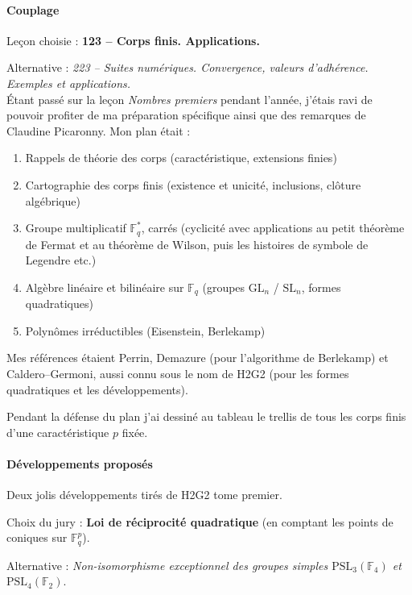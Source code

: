 \documentclass[a4paper, 11pt]{article}
\begin{document}
\def\F{\mathbb{F}}
\def\Z{\mathbb{Z}}
\def\GL{\mathrm{GL}}
\def\SL{\mathrm{SL}}
\def\PSL{\mathrm{PSL}}
\def\Sigmap{\mathfrak{S}}

\paragraph{Couplage}

Leçon choisie : \textbf{123 -- Corps finis. Applications.}

Alternative : \emph{223 -- Suites numériques. Convergence, valeurs d'adhérence.
  Exemples et applications.}\\

Étant passé sur la leçon \emph{Nombres premiers} pendant l'année, j'étais ravi
de pouvoir profiter de ma préparation spécifique ainsi que des remarques de
Claudine Picaronny. Mon plan était :
\begin{enumerate}
\item Rappels de théorie des corps (caractéristique, extensions finies)
\item Cartographie des corps finis (existence et unicité, inclusions, clôture
  algébrique)
\item Groupe multiplicatif $\F_q^*$, carrés (cyclicité avec applications au
  petit théorème de Fermat et au théorème de Wilson, puis les histoires de
  symbole de Legendre etc.)
\item Algèbre linéaire et bilinéaire sur $\F_q$ (groupes $\GL_n$ / $\SL_n$,
  formes quadratiques)
\item Polynômes irréductibles (Eisenstein, Berlekamp)
\end{enumerate}
Mes références étaient Perrin, Demazure (pour l'algorithme de Berlekamp) et
Caldero--Germoni, aussi connu sous le nom de H2G2 (pour les formes quadratiques
et les développements).

Pendant la défense du plan j'ai dessiné au tableau le trellis de tous les corps
finis d'une caractéristique $p$ fixée.



\paragraph{Développements proposés} Deux jolis développements tirés de H2G2 tome
premier.

Choix du jury : \textbf{Loi de réciprocité quadratique} (en comptant les points de
coniques sur $\F_q^p$).

Alternative : \emph{Non-isomorphisme exceptionnel des groupes simples
  $\PSL_3(\F_4)$ et $\PSL_4(\F_2)$}.\\
\end{document}
